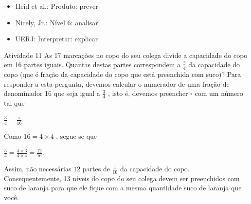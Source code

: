 \begin{multicols}{2}
 \vspace{.1cm}
  
 \vspace{.1cm}
 
\begin{itemize} %
  \item     Heid et al.: Produto: prever
  \item     Nicely, Jr.: Nível 6: analisar
  \item     UERJ: Interpretar: explicar
\end{itemize} %

\begin{resposta*}{Atividade 11}  
  As 17 marcações no copo do seu colega divide a capacidade do copo em 16 partes 
iguais. Quantas destas partes correspondem a   $\frac{3}{4}$   da capacidade do 
copo (que é fração da capacidade do copo que está preenchida com suco)? Para 
responder a esta pergunta, devemos calcular o numerador de uma fração de 
denominador 16 que seja igual a   $\frac{3}{4}$  , isto é, devemos preencher   
$\square$   com um número tal que  
  
  $\frac{3}{4} = \frac{\square}{16}$.  
  
  Como   $16 = 4 \times 4$  , segue-se que  
  
  $\frac{3}{4} = \frac{4 \times 3}{4 \times 4} = \frac{12}{16}$.   
  
  Assim, não necessárias   $12$   partes de   $\frac{1}{16}$   da capacidade do 
copo. Consequentemente,  
  13 níveis do copo do seu colega devem ser preenchidos com suco de laranja para 
que ele fique com a mesma quantidade suco de laranja que você.  
  

\begin{center}
\end{center}


\end{resposta*}
\end{multicols}

